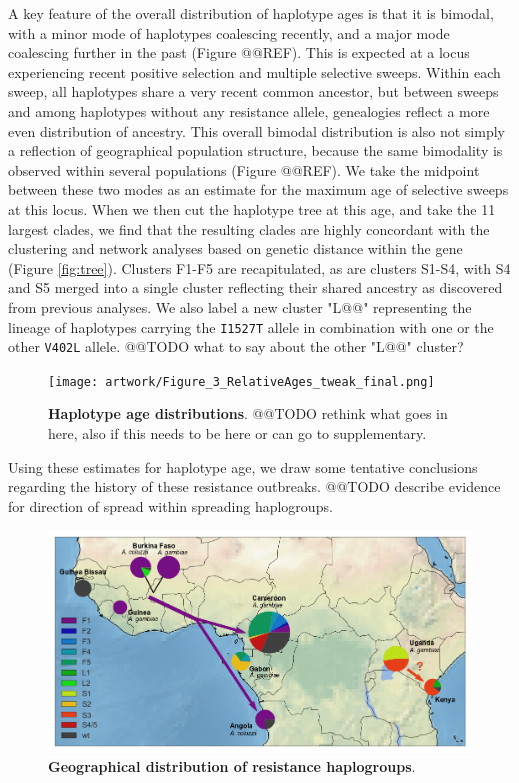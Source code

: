 \documentclass[a4paper,11pt,abstracton]{scrartcl}
\begin{document}
%
A key feature of the overall distribution of haplotype ages is that it is bimodal, with a minor mode of haplotypes coalescing recently, and a major mode coalescing further in the past (Figure @@REF).
%
This is expected at a locus experiencing recent positive selection and multiple selective sweeps.
%
Within each sweep, all haplotypes share a very recent common ancestor, but between sweeps and among haplotypes without any resistance allele, genealogies reflect a more even distribution of ancestry.
%
This overall bimodal distribution is also not simply a reflection of geographical population structure, because the same bimodality is observed within several populations (Figure @@REF). 
%
We take the midpoint between these two modes as an estimate for the maximum age of selective sweeps at this locus.
%
When we then cut the haplotype tree at this age, and take the 11 largest clades, we find that the resulting clades are highly concordant with the clustering and network analyses based on genetic distance within the gene (Figure \ref{fig:tree}).
%
Clusters F1-F5 are recapitulated, as are clusters S1-S4, with S4 and S5 merged into a single cluster reflecting their shared ancestry as discovered from previous analyses.
%
We also label a new cluster "L@@" representing the lineage of haplotypes carrying the \texttt{I1527T} allele in combination with one or the other \texttt{V402L} allele.
%
@@TODO what to say about the other "L@@" cluster?


\begin{figure}[!b]
  \texttt{[image: artwork/Figure\_3\_RelativeAges\_tweak\_final.png]}
  \caption{\textbf{Haplotype age distributions}. @@TODO rethink what goes in here, also if this needs to be here or can go to supplementary.}
  \label{fig:ages}
\end{figure}


%
Using these estimates for haplotype age, we draw some tentative conclusions regarding the history of these resistance outbreaks.
%
@@TODO describe evidence for direction of spread within spreading haplogroups.
%


\begin{figure}[!b]
  \includegraphics[width=1.1\linewidth,center]{artwork/fig_map.png}
  \caption{\textbf{Geographical distribution of resistance haplogroups}. }
  \label{fig:map}
\end{figure}
\end{document}
